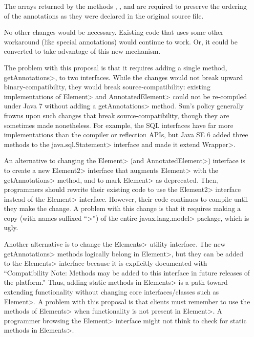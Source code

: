 \documentclass[10pt]{article}
\begin{document}
The arrays returned by the methods ,  
, and  are required
to preserve the ordering of the annotations as they were declared in the
original  source file.

No other changes would be necessary.  Existing code that uses
some other workaround (like special  annotations) would
continue to work.  Or, it could be converted to take advantage of this new
mechanism.

The problem with this proposal is that it requires adding a single method,
\<getAnnotations>, to two interfaces.  While the changes would not break
upward binary-compatibility, they would break source-compatibility:
existing implementations of \<Element> and \<AnnotatedElement> could not
be re-compiled under Java 7 without adding a \<getAnnotations> method.
Sun's policy generally frowns upon such changes that break
source-compatibility, though they are sometimes made nonetheless.
For example, the
SQL interfaces have far more implementations than the compiler or
reflection APIs, but Java SE 6 added three methods to the
\<java.sql.Statement> interface and made it extend \<Wrapper>.

An alternative to changing the \<Element> (and \<AnnotatedElement>) interface is to create a new
\<Element2> interface that augments \<Element> with the \<getAnnotations>
method, and to mark \<Element> as deprecated.  Then, programmers should
rewrite their existing code to use the \<Element2> interface instead of the
\<Element> interface.  However, their code continues to compile until they
make the change.  A problem with this change is that it requires making a
copy (with names suffixed ``>'') of the entire \<javax.lang.model>
package, which is ugly.

Another alternative is to change the \<Elements> utility interface.  The
new \<getAnnotations> methods logically belong in \<Element>, but they can
be added to the \<Elements> interface because it is explicitly documented
with ``Compatibility Note: Methods may be added to this interface in future
releases of the platform.''  Thus, adding static methods in \<Elements> is
a path toward extending functionality without changing core
interfaces/classes such as \<Element>.  A problem with this proposal is
that clients must remember to use the methods of \<Elements> when
functionality is not present in \<Element>.  A programmer browsing the
\<Element> interface might not think to check for static methods in
\<Elements>.
\end{document}
